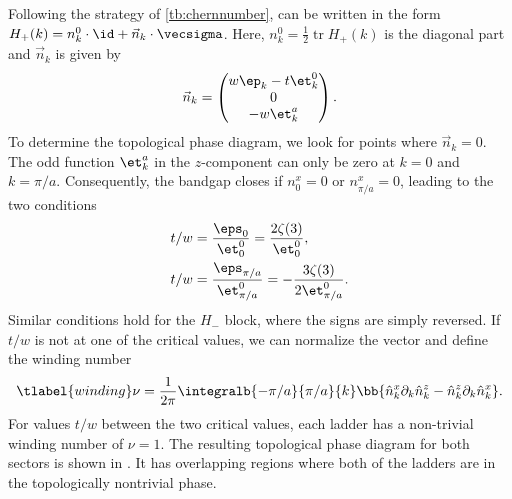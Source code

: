 Following the strategy of \cref{tb:chernnumber},  can be written in the form $H_+(k) = n^0_k \cdot \id + \vec{n}_k \cdot \vecsigma$. Here, $n^0_k = \frac{1}{2} \operatorname{tr} H_+(k)$ is the diagonal part and $\vec{n}_k$ is given by
\begin{align}
    \vec{n}_k = \begin{pmatrix}
        w \ep_k - t \et^0_k \\
        0 \\
        -w \et^a_k
    \end{pmatrix}.
\end{align}
To determine the topological phase diagram, we look for points where $\vec{n}_k=0$.
The odd function $\et^a_k$ in the $z$-component can only be zero at $k = 0$ and $k=\pi/a$.
Consequently, the bandgap closes if $n^x_0 = 0$ or $n^x_{\pi/a} = 0$, leading to the two conditions
\begin{align}
    t/w  &= \frac{\eps_0}{\et^0_0} = \frac{2\zeta(3)}{\et^0_0}, \\
    t/w  &= \frac{\eps_{\pi/a}}{\et^0_{\pi/a}} = - \frac{3 \zeta(3)}{2 \et^0_{\pi/a}}.
\end{align}
Similar conditions hold for the $H_-$ block, where the signs are simply reversed.
If $t/w$ is not at one of the critical values, we can normalize the vector and define the winding number
\begin{align} \tlabel{winding}
    \nu = \frac{1}{2\pi} \integralb{-\pi/a}{\pi/a}{k} \bb{ \hat{n}^x_k \partial_k \hat{n}^z_k - \hat{n}^z_k \partial_k \hat{n}^x_k }.
\end{align}
For values $t/w$ between the two critical values, each ladder has a non-trivial winding number of $\nu = 1$.
The resulting topological phase diagram for both sectors is shown in .
It has overlapping regions where both of the ladders are in the topologically nontrivial phase.



